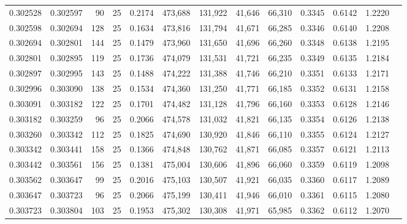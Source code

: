 \begin{tabular}{rrrrrrrrrrrrr}
0.302528 & 0.302597 &    90 &  25 &                                     0.2174 & 473,688 & 131,922 &  41,646 &  66,310 & 0.3345 & 0.6142 & 1.2220 \\
0.302598 & 0.302694 &   128 &  25 &                                     0.1634 & 473,816 & 131,794 &  41,671 &  66,285 & 0.3346 & 0.6140 & 1.2208 \\
0.302694 & 0.302801 &   144 &  25 &                                     0.1479 & 473,960 & 131,650 &  41,696 &  66,260 & 0.3348 & 0.6138 & 1.2195 \\
0.302801 & 0.302895 &   119 &  25 &                                     0.1736 & 474,079 & 131,531 &  41,721 &  66,235 & 0.3349 & 0.6135 & 1.2184 \\
0.302897 & 0.302995 &   143 &  25 &                                     0.1488 & 474,222 & 131,388 &  41,746 &  66,210 & 0.3351 & 0.6133 & 1.2171 \\
0.302996 & 0.303090 &   138 &  25 &                                     0.1534 & 474,360 & 131,250 &  41,771 &  66,185 & 0.3352 & 0.6131 & 1.2158 \\
0.303091 & 0.303182 &   122 &  25 &                                     0.1701 & 474,482 & 131,128 &  41,796 &  66,160 & 0.3353 & 0.6128 & 1.2146 \\
0.303182 & 0.303259 &    96 &  25 &                                     0.2066 & 474,578 & 131,032 &  41,821 &  66,135 & 0.3354 & 0.6126 & 1.2138 \\
0.303260 & 0.303342 &   112 &  25 &                                     0.1825 & 474,690 & 130,920 &  41,846 &  66,110 & 0.3355 & 0.6124 & 1.2127 \\
0.303342 & 0.303441 &   158 &  25 &                                     0.1366 & 474,848 & 130,762 &  41,871 &  66,085 & 0.3357 & 0.6121 & 1.2113 \\
0.303442 & 0.303561 &   156 &  25 &                                     0.1381 & 475,004 & 130,606 &  41,896 &  66,060 & 0.3359 & 0.6119 & 1.2098 \\
0.303562 & 0.303647 &    99 &  25 &                                     0.2016 & 475,103 & 130,507 &  41,921 &  66,035 & 0.3360 & 0.6117 & 1.2089 \\
0.303647 & 0.303723 &    96 &  25 &                                     0.2066 & 475,199 & 130,411 &  41,946 &  66,010 & 0.3361 & 0.6115 & 1.2080 \\
0.303723 & 0.303804 &   103 &  25 &                                     0.1953 & 475,302 & 130,308 &  41,971 &  65,985 & 0.3362 & 0.6112 & 1.2070 \\

\end{tabular}
